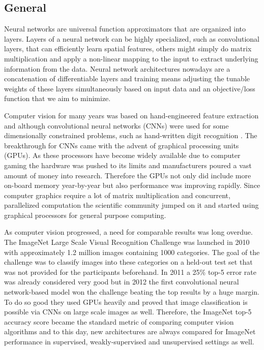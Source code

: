 \documentclass[a4paper,12pt]{article}
\begin{document}
\vspace{7mm}

\subsection{General}

\vspace{7mm}

Neural networks are universal function approximators that are organized into layers. Layers of a neural network can be highly specialized, such as convolutional layers, that can efficiently learn spatial features, others might simply do matrix multiplication and apply a non-linear mapping to the input to extract underlying information from the data. Neural network architectures nowadays are a concatenation of differentiable layers and training means adjusting the tunable weights of these layers simultaneously based on input data and an objective/loss function that we aim to minimize.

\vspace{4mm}

\par Computer vision for many years was based on hand-engineered feature extraction and although convolutional neural networks (CNNs) were used for some dimensionally constrained problems, such as hand-written digit recognition \cite{lecun1998gradient}. The breakthrough for CNNs came with the advent of graphical processing units (GPUs). As these processors have become widely available due to computer gaming the hardware was pushed to its limits and manufacturers poured a vast amount of money into research. Therefore the GPUs not only did include more on-board memory year-by-year but also performance was improving rapidly. Since computer graphics require a lot of matrix multiplication and concurrent, parallelized computation the scientific community jumped on it and started using graphical processors for general purpose computing.

\vspace{4mm}

\par As computer vision progressed, a need for comparable results was long overdue. The ImageNet Large Scale Visual Recognition Challenge \cite{ILSVRC15} was launched in 2010 with approximately 1.2 million images containing 1000 categories. The goal of the challenge was to classify images into these categories on a held-out test set that was not provided for the participants beforehand. In 2011 a 25\% top-5 error rate was already considered very good but in 2012 the first convolutional neural network-based model \cite{krizhevsky2012imagenet} won the challenge beating the top results by a huge margin. To do so good they used GPUs heavily and proved that image classification is possible via CNNs on large scale images as well. Therefore, the ImageNet top-5 accuracy score became the standard metric of comparing computer vision algorithms and to this day, new architectures are always compared for ImageNet performance in supervised, weakly-supervised and unsupervised settings as well.
\end{document}
